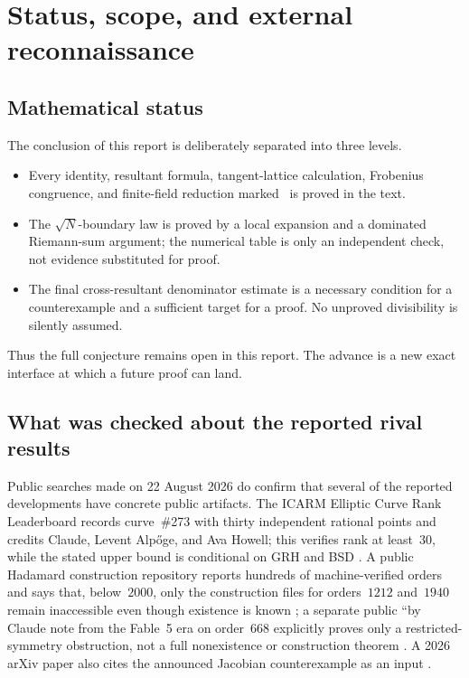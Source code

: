 \documentclass[11pt]{article}
\theoremstyle{definition}
\theoremstyle{remark}
\newcommand{\statusproved}{\textnormal{\sffamily[proved here]}}
\begin{document}
\tableofcontents

\section{Status, scope, and external reconnaissance}

\subsection{Mathematical status}
The conclusion of this report is deliberately separated into three levels.
\begin{itemize}
  \item Every identity, resultant formula, tangent-lattice calculation, Frobenius congruence, and finite-field reduction marked \statusproved\ is proved in the text.
  \item The \(\sqrt N\)-boundary law is proved by a local expansion and a dominated Riemann-sum argument; the numerical table is only an independent check, not evidence substituted for proof.
  \item The final cross-resultant denominator estimate is a necessary condition for a counterexample and a sufficient target for a proof.  No unproved divisibility is silently assumed.
\end{itemize}
Thus the full conjecture remains open in this report.  The advance is a new exact interface at which a future proof can land.

\subsection{What was checked about the reported rival results}
Public searches made on 22 August 2026 do confirm that several of the reported developments have concrete public artifacts.  The ICARM Elliptic Curve Rank Leaderboard records curve~\#273 with thirty independent rational points and credits Claude, Levent Alp\H{o}ge, and Ava Howell; this verifies rank at least~\(30\), while the stated upper bound is conditional on GRH and BSD \cite{ICARM30}.  A public Hadamard construction repository reports hundreds of machine-verified orders and says that, below~\(2000\), only the construction files for orders~\(1212\) and~\(1940\) remain inaccessible even though existence is known \cite{HadamardRepo}; a separate public ``by Claude note from the Fable~5 era on order~\(668\) explicitly proves only a restricted-symmetry obstruction, not a full nonexistence or construction theorem \cite{Fable668}.  A 2026 arXiv paper also cites the announced Jacobian counterexample as an input \cite{JacobianMoment}.
\end{document}
